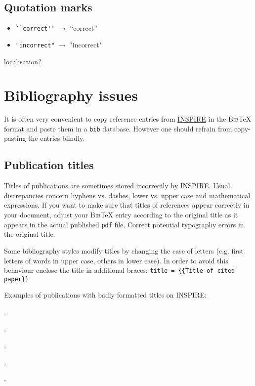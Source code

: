 \documentclass[12pt,a4paper]{article}
\begin{document}
\subsection{Quotation marks}

\begin{itemize}
\item \verb_``correct''_ $\to$ ``correct''
\item \verb_"incorrect"_ $\to$ "incorrect"
\end{itemize}

localisation?

\section{Bibliography issues}

It is often very convenient to copy reference entries from \href{https://inspirehep.net/}{INSPIRE} in the \textsc{Bib}\TeX{} format and paste them in a \texttt{bib} database.
However one should refrain from copy-pasting the entries blindly.

\subsection{Publication titles}

Titles of publications are sometimes stored incorrectly by INSPIRE.
Usual discrepancies concern hyphens vs. dashes, lower vs. upper case and mathematical expressions.
If you want to make sure that titles of references appear correctly in your document, adjust your \textsc{Bib}\TeX{} entry according to the original title as it appears in the actual published \texttt{pdf} file.
Correct potential typography errors in the original title.

Some bibliography styles modify titles by changing the case of letters (e.g. first letters of words in upper case, others in lower case).
In order to avoid this behaviour enclose the title in additional braces: \verb_title = {{Title of cited paper}}_

Examples of publications with badly formatted titles on INSPIRE:

,

,

,

,

,
\end{document}
